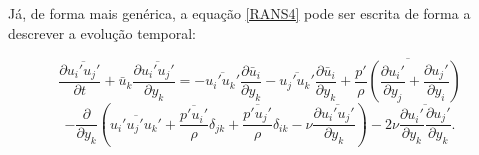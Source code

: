 \documentclass[_ArquivoPrincipal.tex]{subfiles}
\begin{document}
Já, de forma mais genérica, a equação \ref{RANS4} pode ser escrita de forma a descrever a evolução temporal:

\[
    \frac{\partial\overline{u_i'u_j'}}{\partial t}
    +\bar{u}_k\frac{\partial{\overline{u_i'u_j'}}}{\partial y_k}
    =-\overline{u_i'u_k'}\frac{\partial\bar{u}_i}{\partial y_k}
    -\overline{u_j'u_k'}\frac{\partial\bar{u}_i}{\partial y_k}
    +\overline{\frac{p'}{\rho}\left(\frac{\partial u_i'}{\partial y_j}+\frac{\partial u_j'}{\partial y_i}\right)}
    \]
\begin{equation}
    -\frac{\partial}{\partial y_k}\left(\overline{u_i'u_j'u_k'}+\frac{\overline{p'u_i'}}{\rho}\delta_{jk}+\frac{\overline{p'u_j'}}{\rho}\delta_{ik}-\nu\frac{\partial\overline{u_i'u_j'}}{\partial y_k}\right)
    -2\nu\overline{\frac{\partial u_i'}{\partial y_k}\frac{\partial u_j'}{\partial y_k}}
    \text{.}
    \label{RANS5}
\end{equation}
\end{document}
